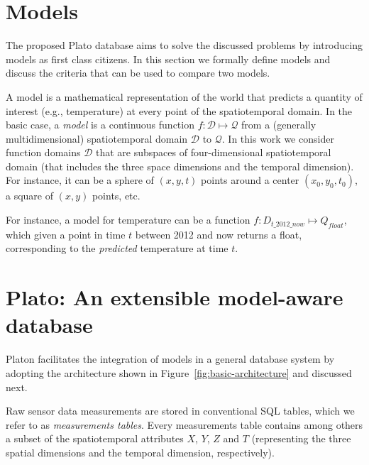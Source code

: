 
\section{Models}
\label{sec:models}


The proposed Plato database aims to solve the discussed problems by introducing models as first class citizens. In this section we formally define models and discuss the criteria that can be used to compare two models.

A model is a mathematical representation of the world that predicts a quantity of interest (e.g., temperature) at every point of the spatiotemporal domain.
In the basic case, a {\em model} is a continuous function $f:\mathcal{D}\mapsto \mathcal{Q}$ from a (generally multidimensional) spatiotemporal domain $\mathcal{D}$ to $\mathcal{Q}$. In this work we consider function domains $\mathcal{D}$ that are subspaces of four-dimensional spatiotemporal domain (that includes the three space dimensions and the temporal dimension). For instance, it can be a sphere of $(x, y, t)$ points around a center $(x_0, y_0, t_0)$, a square of $(x, y)$ points, etc.

\vspace*{0.5cm}
\begin{example}
For instance, a model for temperature can be a function $f:D_{t\_2012\_now}\mapsto Q_{float}$, which given a point in time $t$ between 2012 and now returns a float, corresponding to the \emph{predicted} temperature at time $t$.
\end{example}
\vspace*{0.5cm}

\section{Plato: An extensible model-aware database}
\label{sec:architecture}

Platon facilitates the integration of models in a general database system by adopting the architecture shown in Figure~\ref{fig:basic-architecture} and discussed next.

Raw sensor data measurements are stored in conventional SQL tables, which we refer to as {\em measurements tables}. Every measurements table contains among others a subset of the spatiotemporal attributes $X$, $Y$, $Z$ and $T$ (representing the three spatial dimensions and the temporal dimension, respectively).


